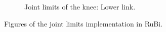 \begin{figure}[ht!]
\begin{subfigure}[b]{0.49\textwidth}
        \caption{Joint limits of the knee: Lower link.}
        \label{fig:joint_limits_knee_lower}
    \end{subfigure}
    \caption{Figures of the joint limits implementation in RuBi.}
\end{figure}    

